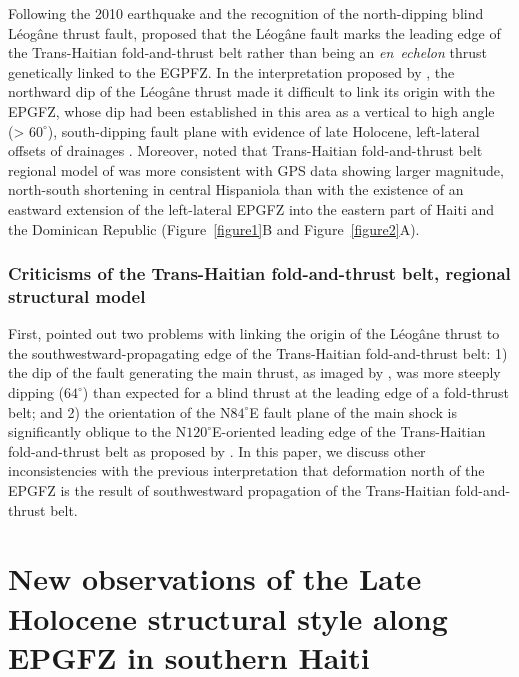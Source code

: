 \documentclass[linenumbers,draft]{agujournal}
\begin{document}
Following the 2010 earthquake and the recognition of the north-dipping blind L\'eog\^ane thrust fault, \citet{calais2010transpressional} proposed that the L\'eog\^ane fault marks the leading edge of the Trans-Haitian fold-and-thrust belt rather than being an \textit{en~echelon} thrust genetically linked to the EGPFZ. In the interpretation proposed by \citet{calais2010transpressional}, the northward dip of the L\'eog\^ane thrust made it difficult to link its origin with the EPGFZ, whose dip had been established in this area as a vertical to high angle (> $60^{\circ}$), south-dipping fault plane with evidence of late Holocene, left-lateral offsets of drainages \citep{prentice2010seismic}. Moreover, \citet{symithe2016present} noted that Trans-Haitian fold-and-thrust belt regional model of \citet{pubellier2000plate} was more consistent with GPS data showing larger magnitude, north-south shortening in central Hispaniola than with the existence of an eastward extension of the left-lateral EPGFZ into the eastern part of Haiti and the Dominican Republic (Figure~\ref{figure1}B and Figure~\ref{figure2}A).

\subsubsection{Criticisms of the Trans-Haitian fold-and-thrust belt, regional structural model}
First, \citet{mercier20112010} pointed out two problems with linking the origin of the L\'eog\^ane thrust to the southwestward-propagating edge of the Trans-Haitian fold-and-thrust belt: 1) the dip of the fault generating the main thrust, as imaged by \citet{mercier20112010}, was more steeply dipping ($64^{\circ}$) than expected for a blind thrust at the leading edge of a fold-thrust belt; and 2) the orientation of the N$84^{\circ}$E fault plane of the main shock is significantly oblique to the N$120^{\circ}$E-oriented leading edge of the Trans-Haitian fold-and-thrust belt as proposed by \citet{pubellier2000plate}. In this paper, we discuss other inconsistencies with the previous interpretation that deformation north of the EPGFZ is the result of southwestward propagation of the Trans-Haitian fold-and-thrust belt.

\section{New observations of the Late Holocene structural style along EPGFZ in southern Haiti}
\end{document}
